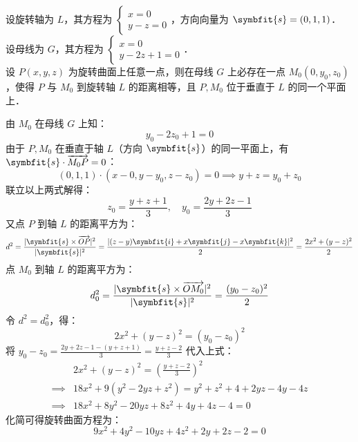 \begin{solution}
    设旋转轴为 $L$，其方程为 $\begin{cases} x = 0 \\ y - z = 0 \end{cases}$，方向向量为 $\symbfit{s} = (0, 1, 1)$．\\
    设母线为 $G$，其方程为 $\begin{cases} x = 0 \\ y - 2z + 1 = 0 \end{cases}$．\\
    设 $P(x, y, z)$ 为旋转曲面上任意一点，则在母线 $G$ 上必存在一点 $M_0(0, y_0, z_0)$，使得 $P$ 与 $M_0$ 到旋转轴 $L$ 的距离相等，且 $P, M_0$ 位于垂直于 $L$ 的同一个平面上．

    由 $M_0$ 在母线 $G$ 上知：
    \begin{equation}
        y_0 - 2z_0 + 1 = 0
    \end{equation}
    由于 $P, M_0$ 在垂直于轴 $L$（方向 $\symbfit{s}$）的同一平面上，有 $\symbfit{s} \cdot \overrightarrow{M_0 P} = 0$：
    \begin{equation}
        (0, 1, 1) \cdot (x - 0, y - y_0, z - z_0) = 0 \implies y + z = y_0 + z_0
    \end{equation}
    联立以上两式解得：
    \begin{equation}
        z_0 = \frac{y + z + 1}{3}, \quad y_0 = \frac{2y + 2z - 1}{3}
    \end{equation}
    又点 $P$ 到轴 $L$ 的距离平方为：
    \begin{equation}
        d^2 = \frac{|\symbfit{s} \times \overrightarrow{OP}|^2}{|\symbfit{s}|^2} = \frac{|(z - y) \symbfit{i} + x \symbfit{j} - x \symbfit{k}|^2}{2} = \frac{2x^2 + (y - z)^2}{2}
    \end{equation}
    点 $M_0$ 到轴 $L$ 的距离平方为：
    \begin{equation}
        d_0^2 = \frac{|\symbfit{s} \times \overrightarrow{OM_0}|^2}{|\symbfit{s}|^2} = \frac{(y_0 - z_0)^2}{2}
    \end{equation}
    令 $d^2 = d_0^2$，得：
    \begin{equation}
        2x^2 + (y - z)^2 = (y_0 - z_0)^2
    \end{equation}
    将 $y_0 - z_0 = \frac{2y + 2z - 1 - (y + z + 1)}{3} = \frac{y + z - 2}{3}$ 代入上式：
    \begin{equation}
        \begin{aligned}
                     & 2x^2 + (y - z)^2 = \left( \frac{y + z - 2}{3} \right)^2    \\
            \implies & 18x^2 + 9(y^2 - 2yz + z^2) = y^2 + z^2 + 4 + 2yz - 4y - 4z \\
            \implies & 18x^2 + 8y^2 - 20yz + 8z^2 + 4y + 4z - 4 = 0
        \end{aligned}
    \end{equation}
    化简可得旋转曲面方程为：
    \begin{equation}
        \boxed{9x^2 + 4y^2 - 10yz + 4z^2 + 2y + 2z - 2 = 0}
    \end{equation}
\end{solution}


